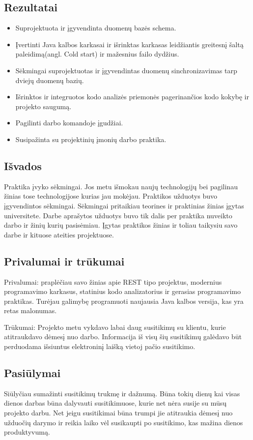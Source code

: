 \documentclass{VUMIFPSkursinis}
\begin{document}
	\subsection{Rezultatai}
		\begin{itemize}
			\item{Suprojektuota ir įgyvendinta duomenų bazės schema.}
			\item{Įvertinti Java kalbos karkasai ir išrinktas karkasas leidžiantis greitesnį šaltą paleidimą(angl. Cold start) ir mažesnius failo dydžius.}
			\item{Sėkmingai suprojektuotas ir įgyvendintas duomenų sinchronizavimas tarp dviejų duomenų bazių.}
			\item{Išrinktos ir integruotos kodo analizės priemonės pagerinančios kodo kokybę ir projekto saugumą.}
			\item{Pagilinti darbo komandoje įgudžiai.}
			\item{Susipažinta su projektinių įmonių darbo praktika.}
		\end{itemize}
		
	\subsection{Išvados}
		Praktika įvyko sėkmingai. Jos metu išmokau naujų technologijų bei pagilinau žinias tose technologijose kurias jau mokėjau. 
		Praktikos užduotys buvo įgyvendintos sėkmingai. Sėkmingai pritaikiau teorines ir praktinias žinias įgytas universitete.
		Darbe aprašytos užduotys buvo tik dalis per praktika nuveikto darbo ir žinių kurių pasisėmiau.
		Įgytas praktikos žinias ir toliau taikysiu savo darbe ir kituose ateities projektuose.
		
	\subsection{Privalumai ir trūkumai}
		Privalumai: praplėčiau savo žinias apie REST tipo projektus, modernius programavimo karkasus, statinius kodo analizatorius ir gerasias programavimo
		praktikas. Turėjau galimybę programuoti naujausia Java kalbos versija, kas yra retas malonumas.  

		Trūkumai: Projekto metu vykdavo labai daug susitikimų su klientu, kurie atitraukdavo dėmesį nuo darbo. Informacija iš visų šių susitikimų galėdavo būt perduodama išsiuntus elektroninį laišką vietoj pačio susitikimo.

	\subsection{Pasiūlymai}
		Siūlyčiau sumažinti susitikimų trukmę ir dažnumą. Būna tokių dienų kai visas dienos darbas būna dalyvauti susitikimuose, kurie net nėra susije su mūsų 
		projekto darbu. Net jeigu susitikimai būna trumpi jie atitraukia dėmesį nuo užduočių darymo ir reikia laiko vėl susikaupti po susitikimo, kas mažina dienos produktyvumą.
		
\printbibliography[heading=bibintoc]
\end{document}
